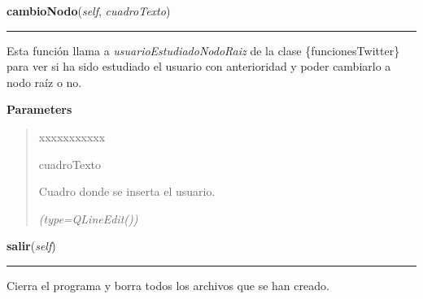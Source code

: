     \label{manejoGrafo:ManejoGrafo:cambioNodo}

    \vspace{0.5ex}

\hspace{.8\funcindent}\begin{boxedminipage}{\funcwidth}

    \raggedright \textbf{cambioNodo}(\textit{self}, \textit{cuadroTexto})

    \vspace{-1.5ex}

    \rule{\textwidth}{0.5\fboxrule}
\setlength{\parskip}{2ex}
    Esta función llama a \textit{usuarioEstudiadoNodoRaiz} de la clase 
    \{funcionesTwitter\} para ver si ha sido estudiado el usuario con 
    anterioridad y poder cambiarlo a nodo raíz o no.

\setlength{\parskip}{1ex}
      \textbf{Parameters}
      \vspace{-1ex}

      \begin{quote}
        \begin{Ventry}{xxxxxxxxxxx}

          \item[cuadroTexto]

          Cuadro donde se inserta el usuario.

            {\it (type=QLineEdit())}

        \end{Ventry}

      \end{quote}

    \end{boxedminipage}

    \label{manejoGrafo:ManejoGrafo:salir}

    \vspace{0.5ex}

\hspace{.8\funcindent}\begin{boxedminipage}{\funcwidth}

    \raggedright \textbf{salir}(\textit{self})

    \vspace{-1.5ex}

    \rule{\textwidth}{0.5\fboxrule}
\setlength{\parskip}{2ex}
    Cierra el programa y borra todos los archivos que se han creado.

\setlength{\parskip}{1ex}
    \end{boxedminipage}

